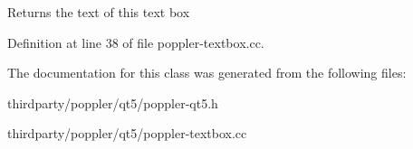 Returns the text of this text box 

Definition at line 38 of file poppler-\/textbox.\+cc.



The documentation for this class was generated from the following files\+:\begin{DoxyCompactItemize}
\item 
thirdparty/poppler/qt5/poppler-\/qt5.\+h\item 
thirdparty/poppler/qt5/poppler-\/textbox.\+cc\end{DoxyCompactItemize}
